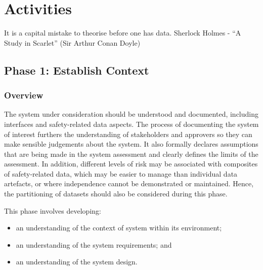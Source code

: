 %
%
\chapter{Activities}\label{bkm:activities}
\dsiwgSectionQuote
  {It is a capital mistake to theorise before one has data.}
  {Sherlock Holmes - ``A Study in Scarlet'' (Sir Arthur Conan Doyle)}


\section{Phase 1: Establish Context}\label{bkm:establishcontext}
\subsection{Overview}
The system under consideration should be understood and documented, including interfaces and safety-related data aspects.  The process of documenting the system of interest furthers the understanding of \glspl{stakeholder} and approvers so they can make sensible judgements about the system. It also formally declares assumptions that are being made in the system assessment and clearly defines the limits of the assessment. In addition, different levels of risk may be associated with composites of safety-related data, which may be easier to manage than individual \glspl{data artefact}, or where independence cannot be demonstrated or maintained. Hence, the partitioning of \glspl{dataset} should also be considered during this phase.

This phase involves developing:
\begin{itemize}
	\item an understanding of the context of system within its environment; 
	\item an understanding of the system requirements; and 
	\item an understanding of the system design.
\end{itemize}

